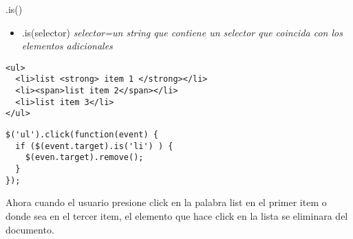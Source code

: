 \begin{frame}[fragile]{.is()} %
\begin{itemize}
    \item .is(selector) \textit{ selector=un string que contiene un selector que coincida con los elementos adicionales}
\end{itemize}
\begin{lstlisting}
<ul>
  <li>list <strong> item 1 </strong></li>
  <li><span>list item 2</span></li>
  <li>list item 3</li>
</ul>
\end{lstlisting}
\begin{lstlisting}
$('ul').click(function(event) {
  if ($(event.target).is('li') ) {
    $(even.target).remove();
  }
});
\end{lstlisting}
Ahora cuando el usuario presione click en la palabra list en el primer item o
donde sea en el tercer item, el elemento que hace click en la lista se
eliminara del documento.
\end{frame}


